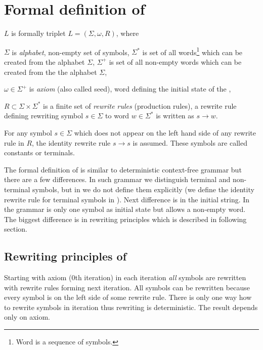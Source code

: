 
\section{Formal definition of \lsystem}

\lsystem $L$ is formally triplet $L = (\Sigma, \omega, R)$, where

\begin{itemize*}
	\item $\Sigma$ is \emph{alphabet}, non-empty set of symbols, $\Sigma^{*}$ is set of all words\footnote{Word is a sequence of symbols.} which can be created from the alphabet $\Sigma$, $\Sigma^{+}$ is set of all non-empty words which can be created from the the alphabet $\Sigma$,
	\item $\omega \in \Sigma^{+}$ is \emph{axiom} (also called seed), word defining the initial state of the \lsystem,
	\item $R \subset \Sigma \times \Sigma^{*}$ is a finite set of \emph{rewrite rules} (production rules), a rewrite rule defining rewriting symbol $s \in \Sigma$ to word $w \in \Sigma^{*}$ is written as $s \rightarrow w$.
\end{itemize*}

For any symbol $s \in \Sigma$ which does not appear on the left hand side of any rewrite rule in $R$, the identity rewrite rule $s \rightarrow s$ is assumed.
These symbols are called constants or terminals.

The formal definition of \lsystem is similar to deterministic context-free grammar but there are a few differences.
In such grammar we distinguish terminal and non-terminal symbols, but in \lsystems we do not define them explicitly (we define the identity rewrite rule for terminal symbols in \lsystems).
Next difference is in the initial string.
In the grammar is only one symbol as initial state but \lsystem allows a non-empty word.
The biggest difference is in rewriting principles which is described in following section.


\subsection{Rewriting principles of \lsystem}

Starting with axiom (0th iteration) in each iteration \emph{all} symbols are rewritten with rewrite rules forming next iteration.
All symbols can be rewritten because every symbol is on the left side of some rewrite rule.
There is only one way how to rewrite symbols in iteration thus rewriting is deterministic.
The result depends only on axiom.

